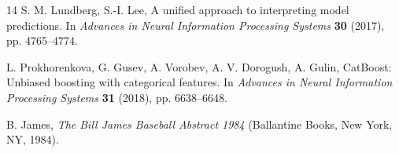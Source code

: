 \documentclass[9pt,twoside]{pnas-new}
\begin{document}
\begin{thebibliography}{14}
S. M. Lundberg, S.-I. Lee, A unified approach to interpreting model predictions. In \textit{Advances in Neural Information Processing Systems} \textbf{30} (2017), pp. 4765--4774.

L. Prokhorenkova, G. Gusev, A. Vorobev, A. V. Dorogush, A. Gulin, CatBoost: Unbiased boosting with categorical features. In \textit{Advances in Neural Information Processing Systems} \textbf{31} (2018), pp. 6638--6648.

B. James, \textit{The Bill James Baseball Abstract 1984} (Ballantine Books, New York, NY, 1984).

\end{thebibliography}
\end{document}
